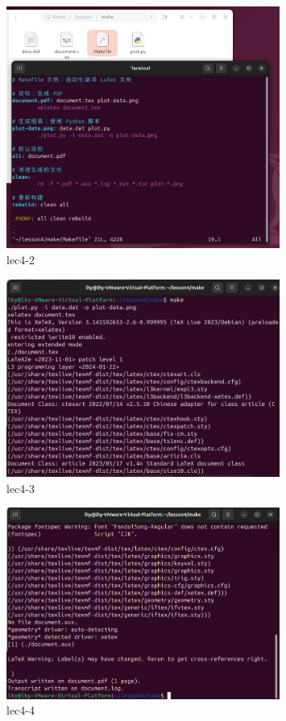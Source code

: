 \documentclass[a4paper, 12pt]{article}
\begin{document}
\begin{figure}[htbp]
    \centering
    \includegraphics[width=0.8\textwidth]{lec4 (2).png}
    \caption{lec4-2}
\end{figure}

\begin{figure}[htbp]
    \centering
    \includegraphics[width=0.8\textwidth]{lec4 (3).png}
    \caption{lec4-3}
    \label{fig:make}
\end{figure}

\begin{figure}[htbp]
    \centering
    \includegraphics[width=0.8\textwidth]{lec4 (4).png}
    \caption{lec4-4}
\end{figure}
\end{document}
